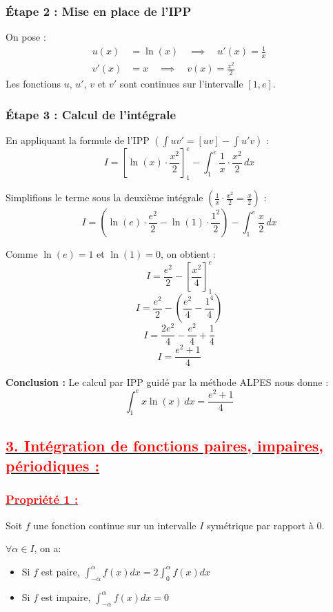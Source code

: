 \documentclass[12pt,a4paper]{article}
\begin{document}
\subsubsection*{Étape 2 : Mise en place de l'IPP}
On pose :
\begin{align*}
    u(x) &= \ln(x) \quad \implies \quad u'(x) = \frac{1}{x} \\
    v'(x) &= x \quad \implies \quad v(x) = \frac{x^2}{2}
\end{align*}
Les fonctions $u$, $u'$, $v$ et $v'$ sont continues sur l'intervalle $[1, e]$.

\subsubsection*{Étape 3 : Calcul de l'intégrale}
En appliquant la formule de l'IPP $\left(\int u v' = [uv] - \int u'v\right)$ :
\[ I = \left[ \ln(x) \cdot \frac{x^2}{2} \right]_{1}^{e} - \int_{1}^{e} \frac{1}{x} \cdot \frac{x^2}{2} \, dx \]

Simplifions le terme sous la deuxième intégrale $\left(\frac{1}{x} \cdot \frac{x^2}{2} = \frac{x}{2}\right)$ :
\[ I = \left( \ln(e) \cdot \frac{e^2}{2} - \ln(1) \cdot \frac{1^2}{2} \right) - \int_{1}^{e} \frac{x}{2} \, dx \]

Comme $\ln(e) = 1$ et $\ln(1) = 0$, on obtient :
\[ I = \frac{e^2}{2} - \left[ \frac{x^2}{4} \right]_{1}^{e} \]
\[ I = \frac{e^2}{2} - \left( \frac{e^2}{4} - \frac{1^4}{4} \right) \]
\[ I = \frac{2e^2}{4} - \frac{e^2}{4} + \frac{1}{4} \]
\[ I = \frac{e^2 + 1}{4} \]

\textbf{Conclusion :} Le calcul par IPP guidé par la méthode ALPES nous donne :
\[ \int_{1}^{e} x \ln(x) \, dx = \frac{e^2 + 1}{4} \]


\subsection*{\underline{\textbf{\textcolor{red}{3. Intégration de fonctions paires, impaires, périodiques : }}}}
\subsubsection*{\underline{\textcolor{red}{Propriété 1 :}}}
Soit \(f\) une fonction continue sur un intervalle \(I\) symétrique par rapport à \(0\).

\( \forall \alpha \in I \), on a:

\begin{itemize}
    \item Si \(f\) est paire, \( \int_{-\alpha}^{\alpha}f(x)dx = 2 \int_{0}^{\alpha}f(x)dx \)
    \item Si \(f\) est impaire, \( \int_{-\alpha}^{\alpha}f(x)dx =  0 \)
\end{itemize}
\end{document}
